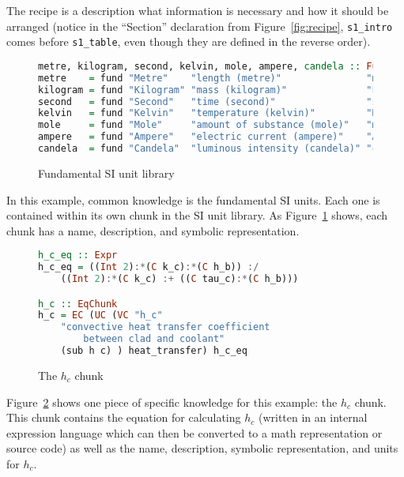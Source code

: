 \documentclass{sig-alternate-05-2015}
\begin{document}
The recipe is a description what information is necessary and how it should be
arranged (notice in the ``Section'' declaration from Figure~\ref{fig:recipe},
\verb|s1_intro| comes before \verb|s1_table|, even though they are defined in
the reverse order).

\begin{figure}
\begin{lstlisting}[language=Haskell, frame=single, showstringspaces=false, basicstyle=\tiny]
metre, kilogram, second, kelvin, mole, ampere, candela :: FundUnit
metre    = fund "Metre"    "length (metre)"               "m"
kilogram = fund "Kilogram" "mass (kilogram)"              "kg"
second   = fund "Second"   "time (second)"                "s"
kelvin   = fund "Kelvin"   "temperature (kelvin)"         "K"
mole     = fund "Mole"     "amount of substance (mole)"   "mol"
ampere   = fund "Ampere"   "electric current (ampere)"    "A"
candela  = fund "Candela"  "luminous intensity (candela)" "cd"
\end{lstlisting}
\caption{Fundamental SI unit library}
\label{fig:know_common}
\end{figure}

In this example, common knowledge is the fundamental SI units. Each one is
contained within its own chunk in the SI unit library. As
Figure~\ref{fig:know_common} shows, each chunk has a name, description, and
symbolic representation.

\begin{figure}
\begin{lstlisting}[language=Haskell, frame=single, showstringspaces=false, basicstyle=\small]
h_c_eq :: Expr
h_c_eq = ((Int 2):*(C k_c):*(C h_b)) :/ 
    ((Int 2):*(C k_c) :+ ((C tau_c):*(C h_b)))

h_c :: EqChunk
h_c = EC (UC (VC "h_c" 
    "convective heat transfer coefficient 
        between clad and coolant"
    (sub h c) ) heat_transfer) h_c_eq
\end{lstlisting}
\caption{The $h_c$ chunk}
\label{fig:know_specific}
\end{figure}

Figure~\ref{fig:know_specific} shows one piece of specific knowledge for this
example: the $h_c$ chunk. This chunk contains the equation for calculating $h_c$
(written in an internal expression language which can then be converted to a
math representation or source code) as well as the name, description, symbolic
representation, and units for $h_c$.
\end{document}
